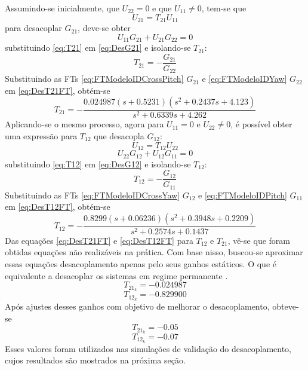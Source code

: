 Assumindo-se inicialmente, que $U_{22} = 0$ e que $U_{11} \neq 0$, tem-se que
\begin{equation}\label{eq:T21}
    U_{21} = T_{21} U_{11}
\end{equation}
\noindent para desacoplar $G_{21}$, deve-se obter
\begin{equation}\label{eq:DesG21}
    U_{11} G_{21} + U_{21} G_{22} = 0
\end{equation}
\noindent substituindo \eqref{eq:T21} em \eqref{eq:DesG21} e isolando-se $T_{21}$:
\begin{equation}\label{eq:DesT21}
    T_{21} = - \frac{G_{21}}{G_{22}}
\end{equation}
Substituindo as FTs \eqref{eq:FTModeloIDCrossPitch} $G_{21}$ e \eqref{eq:FTModeloIDYaw} $G_{22}$ em \eqref{eq:DesT21FT}, obtém-se
\begin{equation}\label{eq:DesT21FT}
    T_{21} = - \frac{0.024987 (s+0.5231) (s^2 + 0.2437s + 4.123)}{s^2 + 0.6339s + 4.262}
\end{equation}
Aplicando-se o mesmo processo, agora para $U_{11} = 0$ e $U_{22} \neq 0$, é possível obter uma expressão para $T_{12}$ que desacopla $G_{12}$:
\begin{equation}\label{eq:T12}
    U_{12} = T_{12} U_{22}
\end{equation}
\begin{equation}\label{eq:DesG12}
    U_{22} G_{12} + U_{12} G_{11} = 0
\end{equation}
\noindent substituindo \eqref{eq:T12} em \eqref{eq:DesG12} e isolando-se $T_{12}$:
\begin{equation}\label{eq:DesT12}
    T_{12} = - \frac{G_{12}}{G_{11}}
\end{equation}
Substituindo as FTs \eqref{eq:FTModeloIDCrossYaw} $G_{12}$ e \eqref{eq:FTModeloIDPitch} $G_{11}$ em \eqref{eq:DesT12FT}, obtém-se
\begin{equation}\label{eq:DesT12FT}
    T_{12} = - \frac{0.8299 (s+0.06236) (s^2 + 0.3948s + 0.2209)}{s^2 + 0.2574s + 0.1437}
\end{equation}
Das equações \eqref{eq:DesT21FT} e \eqref{eq:DesT12FT} para $T_{12}$ e $T_{21}$, vê-se que foram obtidas equações não realizáveis na prática. Com base nisso, buscou-se aproximar essas equações desacoplamento apenas pelo seus ganhos estáticos. O que é equivalente a desacoplar os sistemas em regime permanente \cite{seborg2010process}.
\begin{equation}\label{eq:T21Gain}
    T_{{21}_{k}} = -0.024987
\end{equation}
\begin{equation}\label{eq:T12Gain}
    T_{{12}_{k}} = -0.829900
\end{equation}
Após ajustes desses ganhos com objetivo de melhorar o desacoplamento, obteve-se
\begin{equation}\label{eq:T21GainFinal}
    T_{{21}_{k}} = -0.05
\end{equation}
\begin{equation}\label{eq:T12GainFinal}
    T_{{12}_{k}} = -0.07
\end{equation}
Esses valores foram utilizados nas simulações de validação do desacoplamento, cujos resultados são mostrados na próxima seção.

